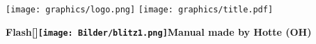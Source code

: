 \documentclass[german,a4paper,twoside]{scrreprt}
\def\bbblitz{\texttt{[image: Bilder/blitz1.png]}}
\begin{document}
\vspace*{2cm}

\begin{center}
  \texttt{[image: graphics/logo.png]}
  \vskip 0.5cm
  \texttt{[image: graphics/title.pdf]}
\end{center}

\vspace*{2cm}

\begin{center}
{\Large\textbf{\textsf{Flash\raisebox{-\baselineskip}[\ht\strutbox]{\bbblitz}Manual made by Hotte (OH)}}}\\
\end{center}

\tableofcontents
\printindex
\end{document}
